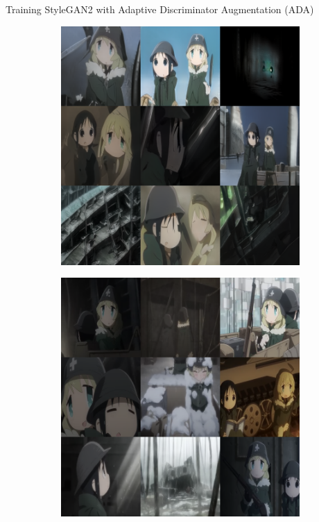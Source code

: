 \documentclass{beamer}                             %
\begin{document}
\begin{frame}
\begin{columns}
\begin{column}{0.33\textwidth}
      \begin{block}{Training StyleGAN2 with Adaptive Discriminator Augmentation (ADA) \cite{stylegan2ada}} 
      \setlength{\parindent}{1em}
        \begin{figure}[h!]
            \centering
            \begin{subfigure}[h]{0.49 \textwidth}
              \includegraphics[scale=0.4]{samples_gan}
            \end{subfigure}
            \hfill
            \begin{subfigure}[h]{0.49 \textwidth}
              \includegraphics[scale=0.4]{samples_real}

\end{subfigure}
\end{figure}
\end{block}
\end{column}
\end{columns}
\end{frame}
\end{document}

